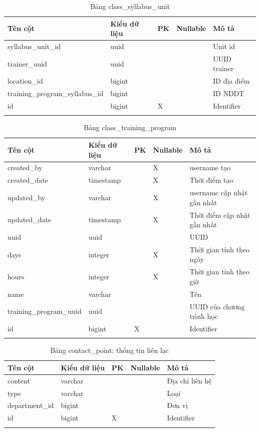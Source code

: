 \documentclass[report.tex]{subfiles}
\begin{document}
\begin{table}[!htb]
\begin{longtable}{|p{3cm}|p{3cm}|p{1cm}|p{1.6cm}|p{6cm}|}
\hline
\textbf{Tên cột} & \textbf{Kiểu dữ liệu} & \textbf{PK} & \textbf{Nullable} & \textbf{Mô tả} \\
\hline
syllabus\_unit\_id & uuid & & & Unit id \\
trainer\_uuid & uuid & & & UUID trainer \\
location\_id & bigint & & & ID địa điểm \\
training\_program\_syllabus\_id & bigint & & & ID NDDT \\
id & bigint & X & & Identifier \\
\hline
\caption[Bảng class\_syllabus\_unit]{Bảng class\_syllabus\_unit}
\end{longtable}
\end{table}
\FloatBarrier

\begin{table}[!htb]
\begin{longtable}{|p{3cm}|p{3cm}|p{1cm}|p{1.6cm}|p{6cm}|}
\hline
\textbf{Tên cột} & \textbf{Kiểu dữ liệu} & \textbf{PK} & \textbf{Nullable} & \textbf{Mô tả} \\
\hline
created\_by & varchar & & X & username tạo \\
created\_date & timestamp & & X & Thời điểm tạo \\
updated\_by & varchar & & X & username cập nhật gần nhất \\
updated\_date & timestamp & & X & Thời điểm cập nhật gần nhất \\
uuid & uuid & & & UUID \\
days & integer & & X & Thời gian tính theo ngày \\
hours & integer & & X & Thời gian tính theo giờ \\
name & varchar & & & Tên \\
training\_program\_uuid & uuid & & & UUID của chương trình học \\
id & bigint & X & & Identifier \\
\hline
\caption[Bảng class\_training\_program]{Bảng class\_training\_program}
\end{longtable}
\end{table}
\FloatBarrier

\begin{table}[!htb]
\begin{longtable}{|p{3cm}|p{3cm}|p{1cm}|p{1.6cm}|p{6cm}|}
\hline
\textbf{Tên cột} & \textbf{Kiểu dữ liệu} & \textbf{PK} & \textbf{Nullable} & \textbf{Mô tả} \\
\hline
content & varchar & & & Địa chỉ liên hệ \\
type & varchar & & & Loại \\
department\_id & bigint & & & Đơn vị \\
id & bigint & X & & Identifier \\
\hline
\caption[Bảng contact\_point]{Bảng contact\_point: thông tin liên lạc}
\end{longtable}
\end{table}
\FloatBarrier
\end{document}
